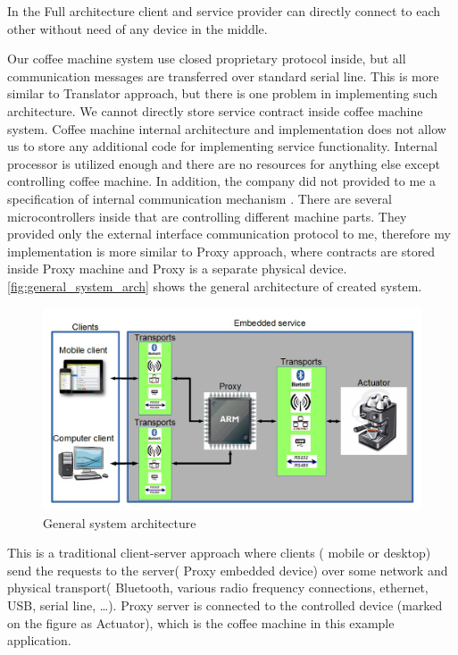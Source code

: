 In the Full architecture client and service provider can directly connect to
each other without need of any device in the middle. 

Our coffee machine system use closed proprietary protocol inside, but all
communication messages are transferred over standard serial line. This is more
similar to Translator approach, but there is one problem in implementing such
architecture. We cannot directly store service contract inside coffee machine
system. Coffee machine internal architecture and implementation does not allow
us to store any additional code for implementing service functionality. Internal
processor is utilized enough and there are no resources for anything else except
controlling coffee machine. In addition, the company did not
provided to me a specification of internal communication mechanism . There
are several microcontrollers inside that are controlling different machine
parts.
They provided  only the external interface communication protocol to me,
therefore my implementation is more similar to Proxy approach, where contracts are stored inside Proxy machine
and Proxy is a separate physical device.
\autoref{fig:general_system_arch} shows the general architecture of created
system.

\begin{center}
 \begin{figure}[h]
	\includegraphics[width=\textwidth]{../images/implementation/system_arch.png}
	\caption{General system architecture }
	\label{fig:general_system_arch}
 \end{figure}
\end{center}

This is a traditional client-server approach where clients ( mobile or desktop)
send the requests to the server( Proxy embedded device) over some network and
physical transport( Bluetooth, various radio frequency connections, ethernet,
\gls{USB}, serial line, \ldots). Proxy server is connected to the controlled device 
(marked on the figure as Actuator), which is the coffee machine in this example
application.

